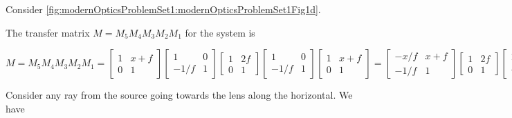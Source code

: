 {\begin{enumerate}
Consider \cref{fig:modernOpticsProblemSet1:modernOpticsProblemSet1Fig1d}.


The transfer matrix $M = M_5 M_4 M_3 M_2 M_1$ for the system is

\begin{dmath}\label{eqn:modernOpticsProblemSet1P1:1670}
M 
= M_5 M_4 M_3 M_2 M_1
=
\begin{bmatrix}
1 & x + f \\
0 & 1 
\end{bmatrix}
\begin{bmatrix}
1 & 0 \\
-1/f & 1
\end{bmatrix}
\begin{bmatrix}
1 & 2 f \\
0 & 1
\end{bmatrix}
\begin{bmatrix}
1 & 0 \\
-1/f & 1
\end{bmatrix}
\begin{bmatrix}
1 & x + f \\
0 & 1 
\end{bmatrix}
=
\begin{bmatrix}
-x/f & x + f \\
-1/f & 1
\end{bmatrix}
\begin{bmatrix}
1 & 2 f \\
0 & 1
\end{bmatrix}
\begin{bmatrix}
1 & x + f \\
-1/f & -x/f
\end{bmatrix}
=
\begin{bmatrix}
-x/f & -x + f \\
-1/f & -1
\end{bmatrix}
\begin{bmatrix}
1 & x + f \\
-1/f & -x/f
\end{bmatrix}
=
\begin{bmatrix}
-1 & -2 x \\
0 & -1
\end{bmatrix}.
\end{dmath}

Consider any ray from the source going towards the lens along the horizontal.  We have


\end{enumerate}}
